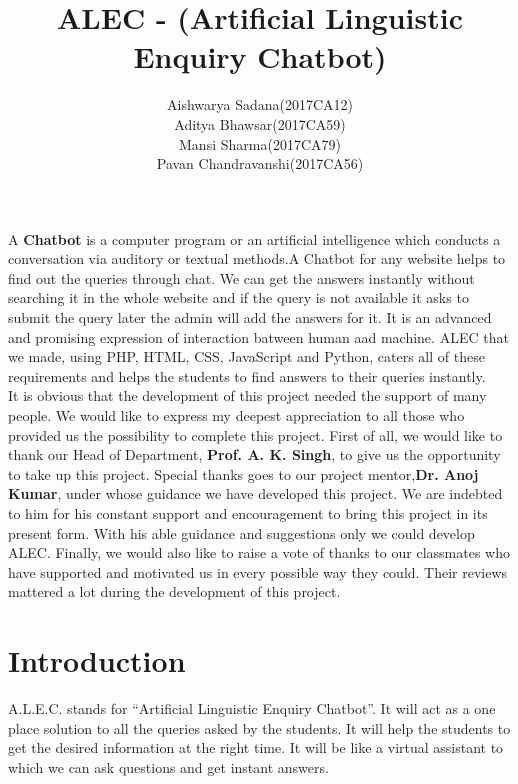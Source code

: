 \documentclass{mnnit}
\begin{document}
\title{ALEC - (Artificial Linguistic Enquiry Chatbot)}
\author{Aishwarya Sadana(2017CA12)\\Aditya Bhawsar(2017CA59)\\Mansi Sharma(2017CA79)\\Pavan Chandravanshi(2017CA56)}
\beforepreface
{}
A \textbf{Chatbot} is a computer program or an artificial intelligence which
conducts a conversation via auditory or textual methods.A Chatbot for any website
helps to find out the queries through chat. We can get the answers instantly
without searching it in the whole website and if the query is not available it
asks to submit the query later the admin will add the answers for it. It is an
advanced and promising expression of interaction batween human aad machine. ALEC
that we made, using PHP, HTML, CSS, JavaScript and Python, caters all of these
requirements and helps the students to find answers to their queries instantly.\\

It is obvious that the development of this project needed the support of many people. We would like to
express my deepest appreciation to all those who provided us the possibility to complete this project.
First of all, we would like to thank our Head of Department, \textbf{Prof. A. K. Singh}, to give us the opportunity
to take up this project.
\vspace{10pt}
\newline
Special thanks goes to our project mentor,\textbf{Dr. Anoj Kumar}, under whose guidance we have developed
this project. We are indebted to him for his constant support and encouragement to bring this project
in its present form. With his able guidance and suggestions only we could develop ALEC.
\vspace{10pt}
\newline
Finally, we would also like to raise a vote of thanks to our classmates who have supported and
motivated us in every possible way they could. Their reviews mattered a lot during the development of
this project.
\afterpreface

\chapter{Introduction}
A.L.E.C. stands for ``Artificial Linguistic Enquiry Chatbot''. It will act as a
one place solution to all the queries asked by the students. It will help the
students to get the desired information at the right time. It will be like a virtual assistant to which we can ask questions and get instant answers.
\end{document}
